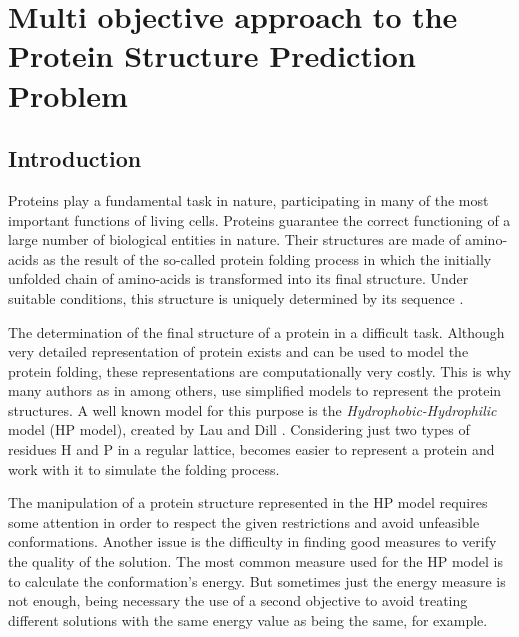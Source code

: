 


\chapter{Multi objective approach to the Protein Structure Prediction Problem}


\section{Introduction} \label{sec:intro}


Proteins play a fundamental task in nature, participating in many of the most important functions of living cells. Proteins guarantee the correct functioning of a large number of biological entities in nature. Their structures are made of amino-acids as the result of the so-called protein folding process in which the initially unfolded chain of amino-acids is transformed into its final structure. Under suitable conditions, this structure is uniquely determined by its sequence \cite{santana2004protein}.


The determination of the final structure of a protein in a difficult task. Although very detailed representation of protein exists and can be used to model the protein folding, these representations are computationally very costly. This is why many authors as in \cite{custodio2004investigation, hsu2003growth, krasnogor2002multimeme, lin2011protein, unger1993genetic} among others, use simplified models to represent the protein structures. A well known model for this purpose is the \textit{Hydrophobic-Hydrophilic} model (HP model), created by Lau and Dill \cite{lau1989lattice}. Considering just two types of residues H and P in a regular lattice, becomes easier to represent a protein and work with it to simulate the folding process.


The manipulation of a protein structure represented in the HP model requires some attention in order to respect the given restrictions and avoid unfeasible conformations. Another issue is the difficulty in finding good measures to verify the quality of the solution. The most common measure used for the HP model is to calculate the conformation's energy. But sometimes just the energy measure is not enough, being necessary the use of a second objective to avoid treating different solutions with the same energy value as being the same, for example.


